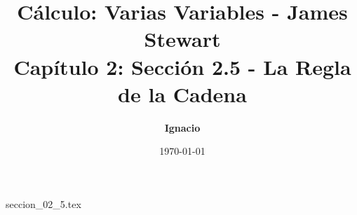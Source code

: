 \documentclass[11pt,spanish,oneside]{report}
\title{\textbf{Cálculo: Varias Variables - James Stewart} \\ \Large Capítulo 2: Sección 2.5 - La Regla de la Cadena}
\author{\textbf{Ignacio}}
\date{\today}
\begin{document}
\maketitle

{seccion_02_5.tex}
\end{document}
